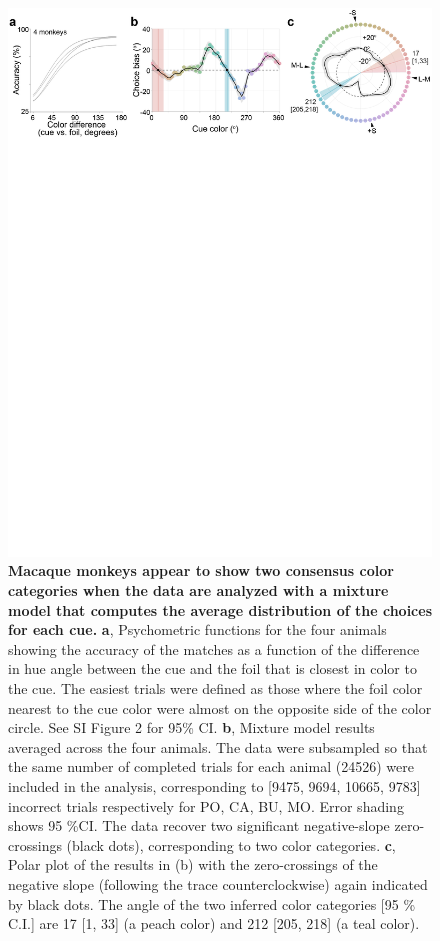 \documentclass[9pt,biorxiv,lineno,onehalfspacing]{lapreprint}
\begin{document}
\begin{refsection}
\begin{figure}
    \begin{fullwidth}
    \centering
    \includegraphics[width=\textwidth+4cm,trim={0 21cm 0 0},clip]{Outputs/Paper/Figures/flat/F2_CombinedMMResults_6.png}
    \caption{\textbf{Macaque monkeys appear to show two consensus color categories when the data are analyzed with a mixture model that computes the average distribution of the choices for each cue.}
	\textbf{a}, Psychometric functions for the four animals showing the accuracy of the matches as a function of the difference in hue angle between the cue and the foil that is closest in color to the cue. 
	The easiest trials were defined as those where the foil color nearest to the cue color were almost on the opposite side of the color circle. See SI Figure 2 for 95\% CI. 
	\textbf{b}, Mixture model results averaged across the four animals. 
    The data were subsampled so that the same number of completed trials for each animal (24526) were included in the analysis, corresponding to [9475, 9694, 10665, 9783] incorrect trials respectively for PO, CA, BU, MO. 
    Error shading shows 95 \%CI. 
	The data recover two significant negative-slope zero-crossings (black dots), corresponding to two color categories. 
	\textbf{c}, Polar plot of the results in (b) with the zero-crossings of the negative slope (following the trace counterclockwise) again indicated by black dots. 
    The angle of the two inferred color categories [95 \% C.I.] are 17 [1, 33] (a peach color) and 212 [205, 218] (a teal color). }
    \label{fig:AvResults}
    \end{fullwidth}
\end{figure}


\end{refsection}
\end{document}
